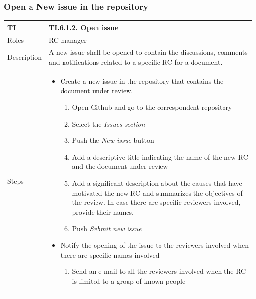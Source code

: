 \documentclass{template/openetcs_article}
\begin{document}
\subsubsection{Open a New issue in the repository}

\begin{flushleft}
\tablefirsthead{}
\tablehead{}
\tabletail{}
\tablelasttail{}
\begin{supertabular}{|m{2cm}|m{13cm}|}
\hline
{}
TI & 
TI.6.1.2. Open issue
\\\hline
Roles &
RC manager
\\\hline
Description &
A new issue shall be opened to contain the discussions, comments and notifications related to a specific RC for a document.
\\\hline
Steps &
\begin{itemize}
\item Create a new issue in the repository that contains the document under review. 
\begin{enumerate}
   \item Open Github and go to the correspondent repository
   \item Select the {\it Issues section}
   \item Push the {\it New issue} button
   \item Add a descriptive title indicating the name of the new RC and the document under review
   \item Add a significant description about the causes that have motivated the new RC and summarizes the objectives of the review. In case there are specific reviewers involved, provide their names.
   	\item Push {\it Submit new issue}
\end{enumerate}
\item Notify the opening of the issue to the reviewers involved when there are specific names involved
\begin{enumerate}
	\item Send an e-mail to all the reviewers involved when the RC is limited to a group of known people 
\end{enumerate}
\end{itemize}
\\\hline
\end{supertabular}
\end{flushleft}
\end{document}
